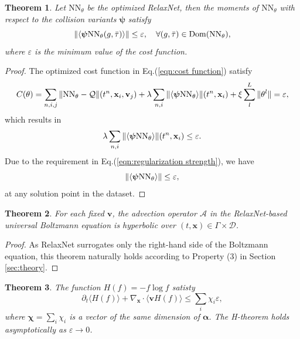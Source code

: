 \documentclass[preprint,3p,12pt,sort&compress]{elsarticle}
\newtheorem{theorem}{Theorem}
\begin{document}
\begin{theorem}\label{theorem:2}
Let $\mathrm{NN}_\theta$ be the optimized RelaxNet, then the moments of $\mathrm{NN}_\theta$ with respect to the collision variants $\boldsymbol\psi$ satisfy
\begin{equation}
    \Arrowvert \langle \boldsymbol\psi \mathrm{NN}_\theta (g,\bar\tau) \rangle \Arrowvert \leq \varepsilon , \quad \forall (g,\bar\tau) \in \mathrm{Dom}(\mathrm{NN}_\theta),
\end{equation}
where $\varepsilon$ is the minimum value of the cost function.
\end{theorem}

\begin{proof}
The optimized cost function in Eq.(\ref{eqn:cost function}) satisfy
\begin{equation}
    C(\theta) = \sum_{n,i,j} \Arrowvert \mathrm{NN}_\theta - \mathcal Q \Arrowvert (t^n,\mathbf x_i,\mathbf v_j) + \lambda \sum_{n,i} \Arrowvert \langle \boldsymbol\psi \mathrm{NN}_\theta \rangle \Arrowvert (t^n,\mathbf x_i) + \xi \sum_l^L \Arrowvert \theta^l \Arrowvert = \varepsilon,
\end{equation}
which results in
\begin{equation}
    \lambda \sum_{n,i} \Arrowvert \langle \boldsymbol\psi \mathrm{NN}_\theta \rangle \Arrowvert (t^n,\mathbf x_i) \leq \varepsilon.
\end{equation}
Due to the requirement in Eq.(\ref{eqn:regularization strength}), we have
\begin{equation}
    \Arrowvert \langle \boldsymbol\psi \mathrm{NN}_\theta \rangle \Arrowvert \leq \varepsilon,
\end{equation}
at any solution point in the dataset.
\end{proof}

\begin{theorem}\label{theorem:3}
For each fixed $\mathbf v$, the advection operator $\mathcal A$ in the RelaxNet-based universal Boltzmann equation is hyperbolic over $(t,\mathbf x)\in \Gamma \times \mathcal D$.
\end{theorem}

\begin{proof}
As RelaxNet surrogates only the right-hand side of the Boltzmann equation, this theorem naturally holds according to Property (3) in Section \ref{sec:theory}.
\end{proof}

\begin{theorem}\label{theorem:4}
The function $H(f)=-f\log f$ satisty
\begin{equation}
   \partial_t \langle H(f) \rangle + \nabla_\mathbf x \cdot \langle \mathbf v H(f) \rangle \leq \sum_i \chi_i \varepsilon,
\end{equation}
where $\boldsymbol\chi=\sum_i \chi_i$ is a vector of the same dimension of $\boldsymbol \alpha$.
The H-theorem holds asymptotically as $\varepsilon \rightarrow 0$.
\end{theorem}
\end{document}
